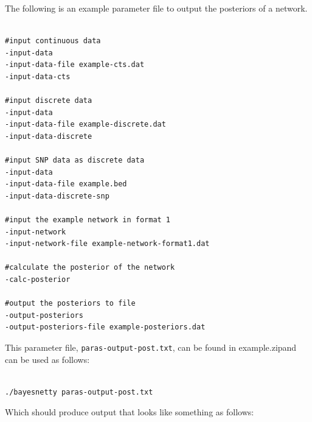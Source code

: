 \documentclass[a4paper,12pt]{article}
\newcommand{\code}[1]{{\footnotesize{{\tt #1}}}}
\begin{document}
The following is an example parameter file to output the posteriors of a network. 
\vspace{0.35cm} \begin{lstlisting}

#input continuous data
-input-data
-input-data-file example-cts.dat
-input-data-cts

#input discrete data
-input-data
-input-data-file example-discrete.dat
-input-data-discrete

#input SNP data as discrete data
-input-data
-input-data-file example.bed
-input-data-discrete-snp

#input the example network in format 1
-input-network
-input-network-file example-network-format1.dat

#calculate the posterior of the network
-calc-posterior

#output the posteriors to file
-output-posteriors
-output-posteriors-file example-posteriors.dat

\end{lstlisting} \vspace{0.35cm}
This parameter file, \code{paras-output-post.txt}, can be found in example.zipand can be used as follows: 
\vspace{0.35cm} \begin{lstlisting}

./bayesnetty paras-output-post.txt

\end{lstlisting} \vspace{0.35cm}
Which should produce output that looks like something as follows: 
\end{document}
